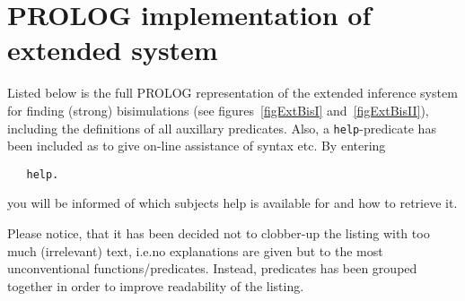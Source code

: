 \chapter[PROLOG implementation of extended system]{PROLOG implementation of extended system}\label{appExtProlog}

Listed below is the full PROLOG representation of the extended inference system for finding (strong) bisimulations (see figures~\ref{figExtBisI} and~\ref{figExtBisII}), including the definitions of all auxillary predicates. Also, a \verb!help!-predicate has been included as to give on-line assistance of syntax etc. By entering
\begin{verbatim}
   help.
\end{verbatim}
you will be informed of which subjects help is available for and how to retrieve it.

Please notice, that it has been decided not to clobber-up the listing with too much (irrelevant) text, i.e.\@ no explanations are given but to the most unconventional functions/predicates. Instead, predicates has been grouped together in order to improve readability of the listing.

\newpage

%

